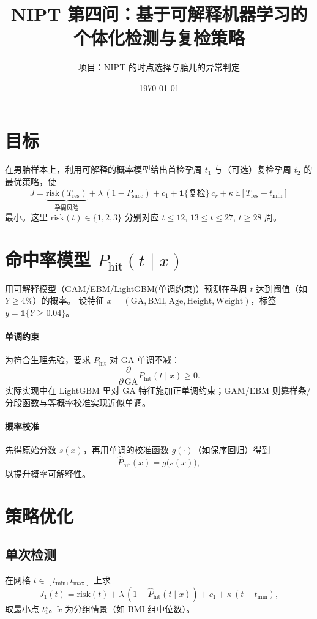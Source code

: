 \documentclass[11pt,a4paper]{article}
\title{NIPT 第四问：基于可解释机器学习的个体化检测与复检策略}
\author{项目：NIPT 的时点选择与胎儿的异常判定}
\date{\today}
\begin{document}
\maketitle

\section{目标}
在男胎样本上，利用可解释的概率模型给出首检孕周 $t_1$ 与（可选）复检孕周 $t_2$ 的最优策略，使
\[
J = \underbrace{\mathrm{risk}(T_{\mathrm{res}})}_{\text{孕周风险}}
+ \lambda\,(1-P_{\mathrm{succ}})
+ c_1 + \mathbf{1}\{\text{复检}\}\,c_r
+ \kappa\,\mathbb{E}[T_{\mathrm{res}}-t_{\min}]
\]
最小。这里 $\mathrm{risk}(t) \in \{1,2,3\}$ 分别对应 $t\!\le\!12$, $13\!\le\!t\!\le\!27$, $t\!\ge\!28$ 周。

\section{命中率模型 $P_{\mathrm{hit}}(t\mid x)$}
用可解释模型（GAM/EBM/LightGBM(单调约束)）预测在孕周 $t$ 达到阈值（如 $Y\!\ge\!4\%$）的概率。
设特征 $x=(\text{GA},\text{BMI},\text{Age},\text{Height},\text{Weight})$，标签
$y=\mathbf{1}\{Y\ge 0.04\}$。

\paragraph{单调约束}
为符合生理先验，要求 $P_{\mathrm{hit}}$ 对 GA 单调不减：
\[
\frac{\partial}{\partial\,\mathrm{GA}} P_{\mathrm{hit}}(t\mid x) \ge 0.
\]
实际实现中在 LightGBM 里对 GA 特征施加正单调约束；GAM/EBM 则靠样条/分段函数与等概率校准实现近似单调。

\paragraph{概率校准}
先得原始分数 $s(x)$，再用单调的校准函数 $g(\cdot)$（如保序回归）得到
\[
\hat P_{\mathrm{hit}}(x) = g\big(s(x)\big),
\]
以提升概率可解释性。

\section{策略优化}
\subsection{单次检测}
在网格 $t\!\in[t_{\min}, t_{\max}]$ 上求
\[
J_1(t)= \mathrm{risk}(t) + \lambda\,(1-\hat P_{\mathrm{hit}}(t\mid \tilde x)) + c_1 + \kappa\,(t-t_{\min}),
\]
取最小点 $t_1^\star$。$\tilde x$ 为分组情景（如 BMI 组中位数）。
\end{document}
